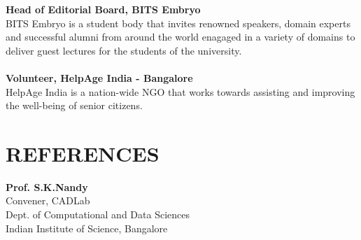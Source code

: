 \documentclass[margin, 10pt]{res} %
\begin{document}
\begin{resume}
\textbf{Head of Editorial Board, BITS Embryo} \\
BITS Embryo is a student body that invites renowned speakers, domain experts and successful alumni from around the world enagaged in a variety of domains to deliver guest lectures for the students of the university.\\ \\
\textbf{ Volunteer, HelpAge India - Bangalore} \\
HelpAge India is a nation-wide NGO that works towards assisting and improving the well-being of senior citizens.


\section{REFERENCES} 

\textbf{Prof. S.K.Nandy} \\
Convener, CADLab \\
Dept. of Computational and Data Sciences \\
Indian Institute of Science, Bangalore


\end{resume}
\end{document}
